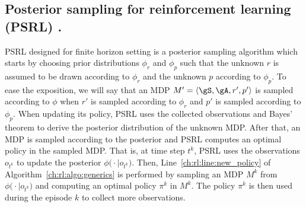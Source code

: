 \subsection{Posterior sampling for reinforcement learning (PSRL) \texorpdfstring{\cite{osband2013more}}{[ORV13]}.}

PSRL designed for finite horizon setting is a posterior sampling algorithm which starts by choosing prior distributions $\phi_r$ and $\phi_p$ such that the unknown $r$ is assumed to be drawn according to $\phi_r$ and the unknown $p$ according to $\phi_p$.
To ease the exposition, we will say that an MDP $M'=\langle\gS,\gA,r',p'\rangle$ is sampled according to $\phi$ when $r'$ is sampled according to $\phi_r$ and $p'$ is sampled according to $\phi_p$.
When updating its policy, PSRL uses the collected observations and Bayes' theorem to derive the posterior distribution of the unknown MDP.
After that, an MDP is sampled according to the posterior and PSRL computes an optimal policy in the sampled MDP.
That is, at time step $t^k$, PSRL uses the observations $o_{t^k}$ to update the posterior $\phi\bigl(\cdot\mid o_{t^k}\bigr)$.
Then, Line~\ref{ch:rl:line:new_policy} of Algorithm~\ref{ch:rl:algo:generics} is performed by sampling an MDP $M^k$ from $\phi\bigl(\cdot\mid o_{t^k}\bigr)$ and computing an optimal policy $\pi^k$ in $M^k$.
The policy $\pi^k$ is then used during the episode $k$ to collect more observations.

